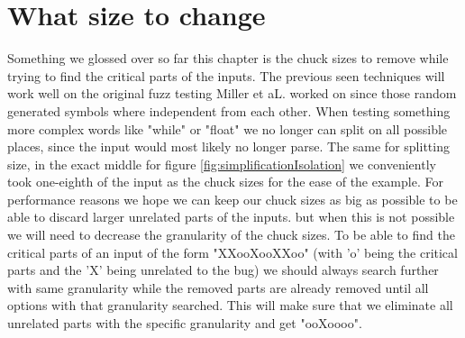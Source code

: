 \section{What size to change}
Something we glossed over so far this chapter is the chuck sizes to remove while trying to find the critical parts of the inputs. The previous seen techniques will work well on the original fuzz testing Miller et aL.\cite{4originalFuzzingUnixUtils} worked on since those random generated symbols where independent from each other. When testing something more complex words like "while" or "float" we no longer can split on all possible places, since the input would most likely no longer parse. The same for splitting size, in the exact middle for figure \ref{fig:simplificationIsolation} we conveniently took one-eighth of the input as the chuck sizes for the ease of the example. For performance reasons we hope we can keep our chuck sizes as big as possible to be able to discard larger unrelated parts of the inputs. but when this is not possible we will need to decrease the granularity of the chuck sizes. To be able to find the critical parts of an input of the form "XXooXooXXoo" (with 'o' being the critical parts and the 'X' being unrelated to the bug) we should always search further with same granularity while the removed parts are already removed until all options with that granularity searched\cite{bookZellerwhyProgramsFail}. This will make sure that we eliminate all unrelated parts with the specific granularity and get "ooXoooo". 






%

